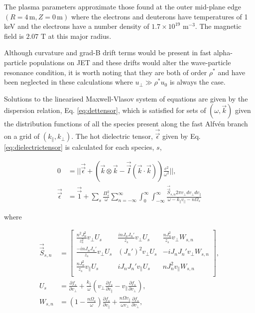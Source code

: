\documentclass[12pt]{iopart}
\begin{document}
The plasma parameters approximate those found at the outer mid-plane edge
$(R=4\, \mathrm{m}, Z=0\, \mathrm{m})$ where the electrons and deuterons have
temperatures of 1 keV and the electrons have a number density
of $1.7\times 10^{19}$ $\mathrm{m^{-3}}$. The magnetic field is $2.07$
$\mathrm{T}$ at this major radius.

Although curvature and grad-B drift terms would be present in fast
alpha-particle populations on JET and these drifts would alter the wave-particle
resonance condition, it is worth noting that they are both of
order $\rho^*$ and have been neglected in these calculations where $u_\bot \gg
\rho^* u_0$ is always the case.

Solutions to the linearised Maxwell-Vlasov system of equations are given by the
dispersion relation, Eq. \ref{eq:dettensor}, which is satisfied for sets of
$(\omega,\vec{k})$ given the distribution functions of all the species present
along the fast Alfv{\'e}n branch  on a grid of $(k_\parallel, k_\bot)$.
The hot dielectric tensor\cite{Stix}, $\vec{\vec{\epsilon}}$ given by Eq.
\ref{eq:dielectrictensor} is calculated for each species, $s$,

\begin{align}
    0 &= ||\vec{\vec{\epsilon}} + \left(\vec{k} \otimes \vec{k} - \vec{\vec{I}}(\vec{k}\cdot\vec{k})\right) \frac{c^2}{\omega^2}||,\label{eq:dettensor}\\
    \vec{\vec{\epsilon}} &= \vec{\vec{1}} + \sum_s \frac{\Pi_s^2}{\omega}\sum_{n=-\infty}^{\infty}
    \int_0^{\infty}
    \int_{-\infty}^{\infty}\frac{\vec{\vec{S}}_{s,n} 2\pi v_\perp dv_\perp dv_\parallel}{\omega - k_\parallel v_\parallel - n \Omega_s}
    \label{eq:dielectrictensor}
\end{align}

\noindent where

\begin{align}
\vec{\vec{S}}_{s,n} &=
\begin{bmatrix}
\frac{n^2J_n^2}{z_s^2}v_\perp U_s & \frac{inJ_nJ_n'}{z_s}v_\perp U_s & \frac{n
  J_n^2}{z_s} v_\perp W_{s,n} \\
\frac{-inJ_nJ_n'}{z_s}v_\perp U_s & (J_n')^2 v_\perp U_s & -iJ_n J_n' v_\perp
  W_{s,n} \\
\frac{nJ_n^2}{z_s}v_\parallel U_s & iJ_nJ_n'v_\parallel U_s & n J_n^2
  v_\parallel W_{s,n} \\
\end{bmatrix}\label{eq:stenor},\\
U_s &= \frac{\partial f_s}{\partial v_\perp} + \frac{k_\parallel}{\omega}  \left(v_\perp \frac{\partial f_s}{\partial v_\parallel} - v_\parallel \frac{\partial f_s}{\partial v_\perp}\right)\label{eq:uterm},\\
  W_{s,n} &=\left(1- \frac{n\Omega_s}{\omega}\right)\frac{\partial f_s}{\partial v_\parallel} + \frac{n\Omega v_\parallel}{\omega v_\perp}\frac{\partial f_s}{\partial v_\perp}\label{eq:wterm},
\end{align}
\end{document}
